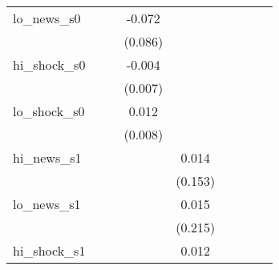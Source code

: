 {\begin{tabular}{l*{8}{c}}
\addlinespace
lo\_news\_s0  &                     &                     &      -0.072         &                     &                     &                     &                     &                     \\
            &                     &                     &     (0.086)         &                     &                     &                     &                     &                     \\
\addlinespace
hi\_shock\_s0 &                     &                     &      -0.004         &                     &                     &                     &                     &                     \\
            &                     &                     &     (0.007)         &                     &                     &                     &                     &                     \\
\addlinespace
lo\_shock\_s0 &                     &                     &       0.012         &                     &                     &                     &                     &                     \\
            &                     &                     &     (0.008)         &                     &                     &                     &                     &                     \\
\addlinespace
hi\_news\_s1  &                     &                     &                     &       0.014         &                     &                     &                     &                     \\
            &                     &                     &                     &     (0.153)         &                     &                     &                     &                     \\
\addlinespace
lo\_news\_s1  &                     &                     &                     &       0.015         &                     &                     &                     &                     \\
            &                     &                     &                     &     (0.215)         &                     &                     &                     &                     \\
\addlinespace
hi\_shock\_s1 &                     &                     &                     &       0.012\sym{**} &                     &                     &                     &                     \\

\end{tabular}}
